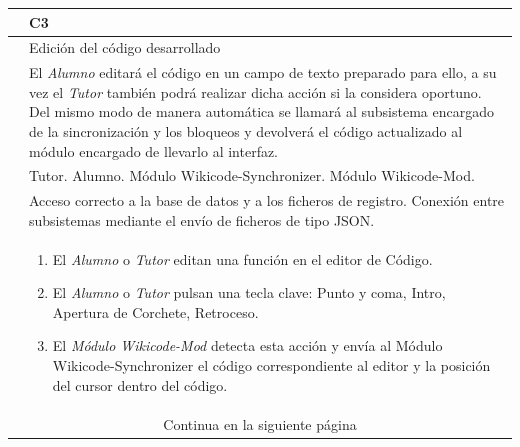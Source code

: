 \begin{table}[h]
\centering
\begin{tabular}{ | p{} | p{} | }
	\hline
	\cellcolor[gray]{.8}{ID} & C3 \\
	\hline 
	\cellcolor[gray]{.8}{Nombre} &  Edición del código desarrollado\\
	\hline
	\cellcolor[gray]{.8}{Descripción} &  El \emph{Alumno} editará el código en un campo de texto preparado para ello, a su vez el \emph{Tutor} también podrá realizar dicha acción si la considera oportuno. Del mismo modo de manera automática se llamará al subsistema encargado de la sincronización y los bloqueos y devolverá el código actualizado al módulo encargado de llevarlo al interfaz. \\
	\hline
	\cellcolor[gray]{.8}{Actores} & Tutor. Alumno. Módulo Wikicode-Synchronizer. Módulo Wikicode-Mod. \\
	\hline
	\cellcolor[gray]{.8}{Asunciones} & Acceso correcto a la base de datos y a los ficheros de registro. Conexión entre subsistemas mediante el envío de ficheros de tipo JSON. \\
	\hline
	\cellcolor[gray]{.8}{Pasos} & \begin{enumerate}
		\item El \emph{Alumno} o \emph{Tutor} editan una función en el editor de Código. 
		\item El \emph{Alumno} o \emph{Tutor} pulsan una tecla clave: Punto y coma, Intro, Apertura de Corchete, Retroceso.
		\item El \emph{Módulo Wikicode-Mod} detecta esta acción y envía al {Módulo Wikicode-Synchronizer} el código correspondiente al editor y la posición del cursor dentro del código.
		\end{enumerate} \\
	\hline
	\multicolumn{2}{|c|}{Continua en la siguiente página} \\
	\hline
\end{tabular}
\end{table}

\newpage


